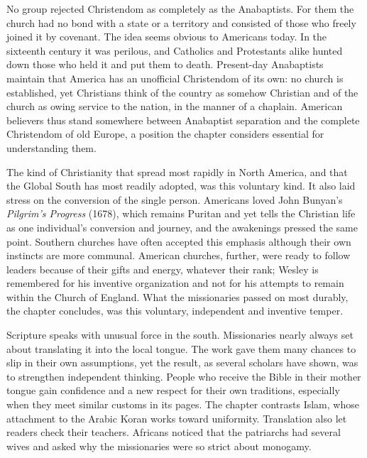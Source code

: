 No group rejected Christendom as completely as the Anabaptists. For them the church had no bond with
a state or a territory and consisted of those who freely joined it by covenant. The idea seems
obvious to Americans today. In the sixteenth century it was perilous, and Catholics and Protestants
alike hunted down those who held it and put them to death. Present-day Anabaptists maintain that
America has an unofficial Christendom of its own: no church is established, yet Christians think of
the country as somehow Christian and of the church as owing service to the nation, in the manner of a
chaplain. American believers thus stand somewhere between Anabaptist separation and the complete
Christendom of old Europe, a position the chapter considers essential for understanding them.

The kind of Christianity that spread most rapidly in North America, and that the Global South has
most readily adopted, was this voluntary kind. It also laid stress on the conversion of the single
person. Americans loved John Bunyan's \emph{Pilgrim's Progress} (1678), which remains Puritan and yet
tells the Christian life as one individual's conversion and journey, and the awakenings pressed the
same point. Southern churches have often accepted this emphasis although their own instincts are more
communal. American churches, further, were ready to follow leaders because of their gifts and
energy, whatever their rank; Wesley is remembered for his inventive organization and not for his
attempts to remain within the Church of England. What the missionaries passed on most durably,
the chapter concludes, was this voluntary, independent and inventive temper.

Scripture speaks with unusual force in the south. Missionaries nearly always set about translating it
into the local tongue. The work gave them many chances to slip in their own assumptions, yet the
result, as several scholars have shown, was to strengthen independent thinking. People who receive
the Bible in their mother tongue gain confidence and a new respect for their own traditions,
especially when they meet similar customs in its pages. The chapter contrasts Islam, whose attachment
to the Arabic Koran works toward uniformity. Translation also let readers check their teachers.
Africans noticed that the patriarchs had several wives and asked why the missionaries were so strict
about monogamy.


